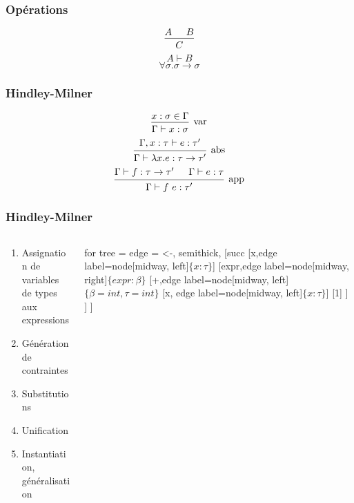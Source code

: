 \documentclass{beamer}
\begin{document}
\begin{frame}
		\frametitle{Opérations}
		\begin{center}
				\[
				\begin{prooftree}
						\hypo{A}
						\hypo{B}
						\infer2{C}
				\end{prooftree}
				\]
				\newline
				\[
				A \vdash B
				\]
				\newline
				\[
				\forall \sigma. \sigma\to\sigma
		\]
		\end{center}
\end{frame}

\begin{frame}
\frametitle{Hindley-Milner}
		\[
		\begin{prooftree}
				\hypo{x:\sigma\in\Gamma}
				\infer1[var]{\Gamma \vdash x:\sigma}
		\end{prooftree}
		\]
		\newline
		\[
		\begin{prooftree}
				\hypo{\Gamma, x:\tau \vdash e:\tau'}
				\infer1[abs]{\Gamma \vdash \lambda x.e:\tau \to \tau'}
		\end{prooftree}
		\]
		\newline
		\[
		\begin{prooftree}
				\hypo{\Gamma \vdash f:\tau \to \tau'}
				\hypo{\Gamma \vdash e : \tau}
				\infer2[app]{\Gamma \vdash f\ e : \tau'}
		\end{prooftree}
		\]
\end{frame}

\begin{frame}
		\frametitle{Hindley-Milner}
		\begin{columns}
				\begin{column}{0.5\textwidth}
						\begin{enumerate}
								\item Assignation de variables de types aux expressions
								\item Génération de contraintes
								\item Substitutions
								\item Unification
								\item Instantiation, généralisation
						\end{enumerate}
				\end{column}
				\begin{column}{0.5\textwidth}
						\begin{forest}
								for tree = {
										edge = {<-, semithick},
								}
								[succ
								[x,edge label={node[midway, left]{$\{x:\tau\}$}}]
										[expr,edge label={node[midway, right]{$\{expr:\beta\}$}}
												[+,edge label={node[midway, left]{$\{\beta = int, \tau = int\}$}}
														[x, edge label={node[midway, left]{$\{x:\tau\}$}}]
														[1]	
												]
										]
								]
						\end{forest}
				\end{column}
		\end{columns}
\end{frame}
\end{document}
